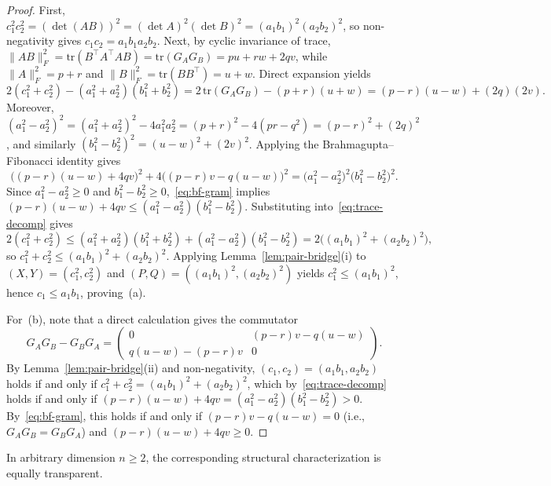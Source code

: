 \documentclass[11pt,a4paper]{article}
\theoremstyle{definition}
\newcommand{\tr}{\mathrm{tr}}
\begin{document}
\begin{proof}
First, $c_1^2 c_2^2 = (\det(AB))^2 = (\det A)^2 (\det B)^2 = (a_1 b_1)^2 (a_2 b_2)^2$, so non-negativity gives $c_1 c_2 = a_1 b_1 a_2 b_2$. Next, by cyclic invariance of trace, $\|AB\|_F^2 = \tr(B^\top A^\top A B) = \tr(G_A G_B) = pu + rw + 2qv$, while $\|A\|_F^2 = p + r$ and $\|B\|_F^2 = \tr(B B^\top) = u + w$. Direct expansion yields
\begin{equation}\label{eq:trace-decomp}
  2(c_1^2 + c_2^2) - (a_1^2 + a_2^2)(b_1^2 + b_2^2)
  = 2\,\tr(G_A G_B) - (p + r)(u + w)
  = (p - r)(u - w) + (2q)(2v).
\end{equation}
Moreover, $(a_1^2 - a_2^2)^2 = (a_1^2 + a_2^2)^2 - 4 a_1^2 a_2^2 = (p + r)^2 - 4(pr - q^2) = (p - r)^2 + (2q)^2$, and similarly $(b_1^2 - b_2^2)^2 = (u - w)^2 + (2v)^2$. Applying the Brahmagupta--Fibonacci identity gives
\begin{equation}\label{eq:bf-gram}
  \bigl((p - r)(u - w) + 4qv\bigr)^2
  + 4\bigl((p - r)v - q(u - w)\bigr)^2
  = \bigl(a_1^2 - a_2^2\bigr)^2 \bigl(b_1^2 - b_2^2\bigr)^2.
\end{equation}
Since $a_1^2 - a_2^2 \ge 0$ and $b_1^2 - b_2^2 \ge 0$,~\eqref{eq:bf-gram} implies $(p - r)(u - w) + 4qv \le (a_1^2 - a_2^2)(b_1^2 - b_2^2)$. Substituting into~\eqref{eq:trace-decomp} gives
\[
  2(c_1^2 + c_2^2) \le (a_1^2 + a_2^2)(b_1^2 + b_2^2) + (a_1^2 - a_2^2)(b_1^2 - b_2^2)
  = 2\bigl((a_1 b_1)^2 + (a_2 b_2)^2\bigr),
\]
so $c_1^2 + c_2^2 \le (a_1 b_1)^2 + (a_2 b_2)^2$. Applying Lemma~\ref{lem:pair-bridge}(i) to $(X, Y) = (c_1^2, c_2^2)$ and $(P, Q) = ((a_1 b_1)^2, (a_2 b_2)^2)$ yields $c_1^2 \le (a_1 b_1)^2$, hence $c_1 \le a_1 b_1$, proving~(a).

For~(b), note that a direct calculation gives the commutator
\[
  G_A G_B - G_B G_A = \begin{pmatrix} 0 & (p - r)v - q(u - w) \\ q(u - w) - (p - r)v & 0 \end{pmatrix}.
\]
By Lemma~\ref{lem:pair-bridge}(ii) and non-negativity, $(c_1, c_2) = (a_1 b_1, a_2 b_2)$ holds if and only if $c_1^2 + c_2^2 = (a_1 b_1)^2 + (a_2 b_2)^2$, which by~\eqref{eq:trace-decomp} holds if and only if $(p - r)(u - w) + 4qv = (a_1^2 - a_2^2)(b_1^2 - b_2^2) > 0$. By~\eqref{eq:bf-gram}, this holds if and only if $(p - r)v - q(u - w) = 0$ (i.e., $G_A G_B = G_B G_A$) and $(p - r)(u - w) + 4qv \ge 0$.
\end{proof}

In arbitrary dimension $n \ge 2$, the corresponding structural characterization is equally transparent.
\end{document}
